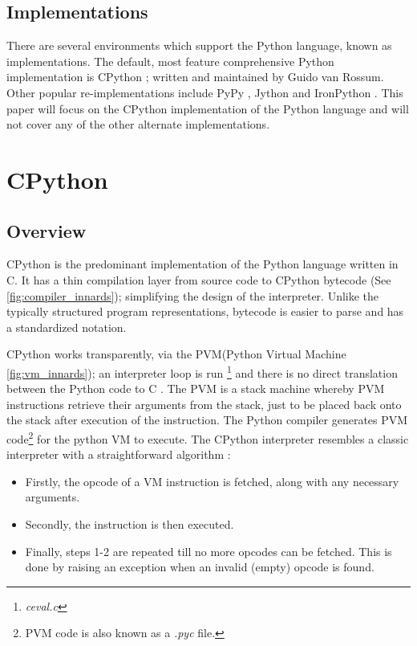 		\subsection{Implementations}
		\par There are several environments which support the Python language, known as implementations. The default, most feature comprehensive Python implementation is 
		CPython \cite[]{vanrossum1995python}; written and maintained by Guido van Rossum. Other popular re-implementations include PyPy \cite[]{bolz2009tracing}, 
		Jython \cite[]{juneau2010definitive} and IronPython \cite[]{mueller2010professional}. This paper will focus on the CPython implementation of the Python language and
		will not cover any of the other alternate implementations.

	\section{CPython}
		\subsection{Overview}
		\par CPython is the predominant implementation of the Python language written in C. It has a thin compilation layer from source code to CPython bytecode (See \ref{fig:compiler_innards}); simplifying the design of the interpreter.
		Unlike the typically structured program representations, bytecode is easier to parse and has a standardized notation.
		\par CPython works transparently, via the PVM(Python Virtual Machine \ref{fig:vm_innards}); an interpreter loop is run \footnote{\label{footnote:ceval}\textit{ceval.c}} and there is no direct translation between the Python code to C \cite[pp.1--2]{aycock1998converting}. 
		The PVM is a stack machine whereby PVM instructions retrieve their arguments from the stack, just to be placed back onto the stack after execution of the instruction. The Python compiler generates PVM code\footnote{PVM code is also known as a \textit{.pyc} file.} for the python VM to execute.
		The CPython interpreter resembles a classic interpreter with a straightforward algorithm \cite[pp.2--4]{aycock1998converting}: 
		\begin{itemize}
			\item[1.] Firstly, the opcode of a VM instruction is fetched, along with any necessary arguments.
			\item[2.] Secondly, the instruction is then executed.
			\item[3.] Finally, steps 1-2 are repeated till no more opcodes can be fetched. This is done by raising an exception when an invalid (empty) opcode is found.  
		\end{itemize}

